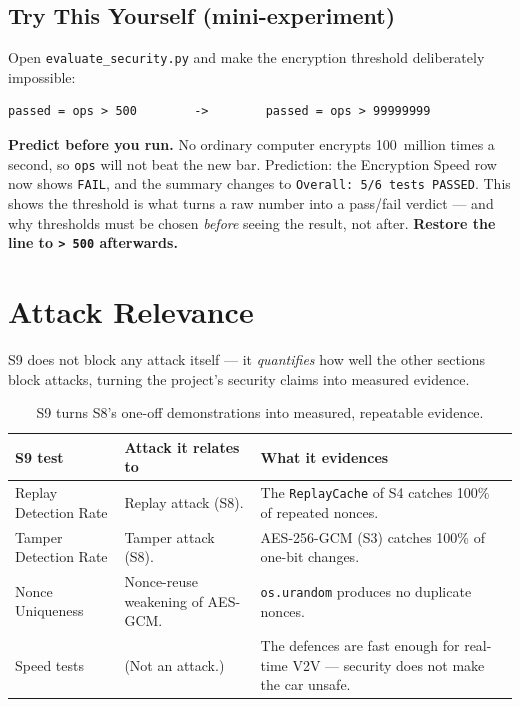 \documentclass[11pt,a4paper]{report}
\begin{document}
\subsection{Try This Yourself (mini-experiment)}
Open \texttt{evaluate\_security.py} and make the encryption threshold
deliberately impossible:
\begin{lstlisting}[style=term]
passed = ops > 500        ->        passed = ops > 99999999
\end{lstlisting}
\textbf{Predict before you run.} No ordinary computer encrypts 100~million times
a second, so \texttt{ops} will not beat the new bar. Prediction: the Encryption
Speed row now shows \texttt{FAIL}, and the summary changes to \texttt{Overall:
5/6 tests PASSED}. This shows the threshold is what turns a raw number into a
pass/fail verdict --- and why thresholds must be chosen \emph{before} seeing the
result, not after. \textbf{Restore the line to \texttt{> 500} afterwards.}

\section{Attack Relevance}

S9 does not block any attack itself --- it \emph{quantifies} how well the other
sections block attacks, turning the project's security claims into measured
evidence.

\begin{table}[h]
\centering
\small
\begin{tabular}{@{}p{3.6cm} p{4.2cm} p{4.6cm}@{}}
\toprule
\textbf{S9 test} & \textbf{Attack it relates to} & \textbf{What it evidences}\\
\midrule
Replay Detection Rate & Replay attack (S8). & The \texttt{ReplayCache} of S4
catches 100\% of repeated nonces.\\
Tamper Detection Rate & Tamper attack (S8). & AES-256-GCM (S3) catches 100\% of
one-bit changes.\\
Nonce Uniqueness & Nonce-reuse weakening of AES-GCM. & \texttt{os.urandom}
produces no duplicate nonces.\\
Speed tests & (Not an attack.) & The defences are fast enough for real-time V2V
--- security does not make the car unsafe.\\
\bottomrule
\end{tabular}
\caption{S9 turns S8's one-off demonstrations into measured, repeatable evidence.}
\end{table}
\end{document}
